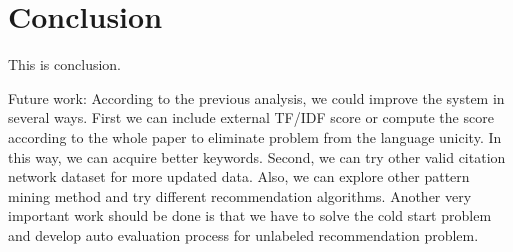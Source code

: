 \section{Conclusion}

This is conclusion.

Future work:
According to the previous analysis, we could improve the system in several ways. First we can include external TF/IDF score or compute the score according to the whole paper to eliminate problem from the language unicity. In this way, we can acquire better keywords. Second, we can try other valid citation network dataset for more updated data. Also, we can explore other pattern mining method and try different recommendation algorithms. Another very important work should be done is that we have to solve the cold start problem and develop auto evaluation process for unlabeled recommendation problem. 